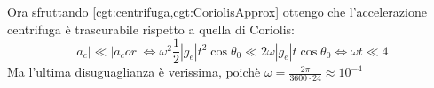 \documentclass[../main.tex]{subfiles}
\begin{document}
Ora sfruttando \cref{cgt:centrifuga,cgt:CoriolisApprox} ottengo che l'accelerazione centrifuga è trascurabile rispetto
a quella di Coriolis:
\begin{equation*}
	|a_c|\ll|a_cor| \iff \omega^2\frac 12|g_e|t^2\cos \theta_0\ll 2\omega|g_e| t\cos \theta_0 \iff
	\omega t\ll 4
\end{equation*}
Ma l'ultima disuguaglianza è verissima, poichè $\omega=\frac{2\pi}{3600\cdot 24}\approx 10^{-4}$
\end{document}
